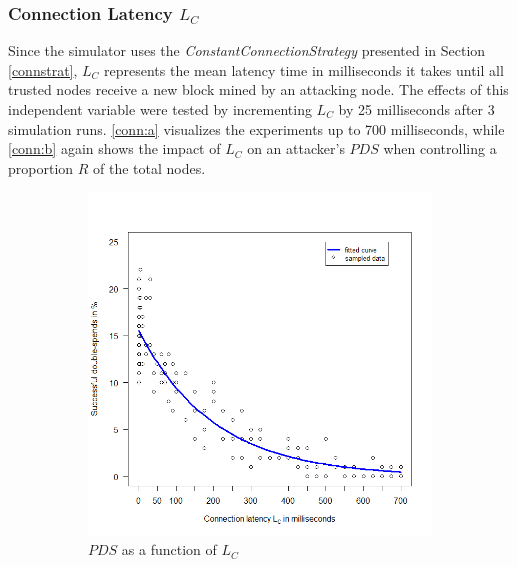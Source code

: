 \documentclass[a4paper,12pt,twoside]{report}
\begin{document}
\subsubsection{Connection Latency $L_C$}
Since the simulator uses the \textit{ConstantConnectionStrategy} presented in Section \ref{connstrat}, $L_C$ represents the mean latency time in milliseconds it takes until all trusted nodes receive a new block mined by an attacking node. The effects of this independent variable were tested by incrementing $L_C$ by 25 milliseconds after 3 simulation runs. \autoref{conn:a} visualizes the experiments up to 700 milliseconds, while \autoref{conn:b} again shows the impact of $L_C$ on an attacker's $PDS$ when controlling a proportion $R$ of the total nodes.\begin{figure}[hb!]
\centering
\begin{subfigure}{.5\textwidth}
  \centering
  \includegraphics[width=\linewidth]{Experiments/ConnLatency/connection.png}
  \caption{$PDS$ as a function of $L_{C}$}
  \label{conn:a}
\end{subfigure}%
\begin{subfigure}{.5\textwidth}
  \centering

\end{subfigure}
\end{figure}
\end{document}
